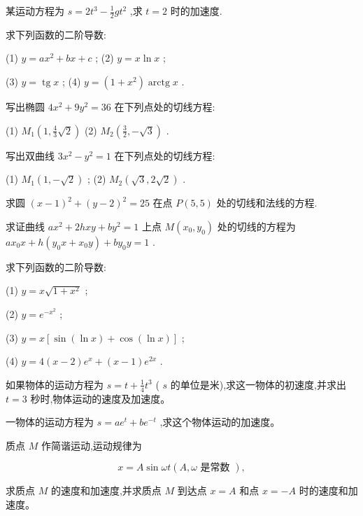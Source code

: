 \documentclass[lang=cn,newtx,10pt,scheme=chinese]{elegantbook}
\begin{document}
\begin{problemset}[练习]

\item 某运动方程为 \(s = 2{t}^{3} - \frac{1}{2}g{t}^{2}\) ,求 \(t = 2\) 时的加速度.

\item 求下列函数的二阶导数:

(1) \(y = a{x}^{2} + {bx} + c\) ; (2) \(y = x\ln x\) ;

(3) \(y = \operatorname{tg}x\) ; (4) \(y = \left( {1 + {x}^{2}}\right) \operatorname{arctg}x\) .

\end{problemset}

\begin{problemset}[习 题 七]

\item 写出椭圆 \(4{x}^{2} + 9{y}^{2} = {36}\) 在下列点处的切线方程:

(1) \({M}_{1}\left( {1,\frac{4}{3}\sqrt{2}}\right)\) (2) \({M}_{2}\left( {\frac{3}{2}, - \sqrt{3}}\right)\) .

\item 写出双曲线 \(3{x}^{2} - {y}^{2} = 1\) 在下列点处的切线方程:

(1) \({M}_{1}\left( {1, - \sqrt{2}}\right)\) ; (2) \({M}_{2}\left( {\sqrt{3},2\sqrt{2}}\right)\) .

\item 求圆 \({\left( x - 1\right) }^{2} + {\left( y - 2\right) }^{2} = {25}\) 在点 \(P\left( {5,5}\right)\) 处的切线和法线的方程.

\item 求证曲线 \(a{x}^{2} + {2hxy} + b{y}^{2} = 1\) 上点 \(M\left( {{x}_{0},{y}_{0}}\right)\) 处的切线的方程为 \(a{x}_{0}x + h\left( {{y}_{0}x + {x}_{0}y}\right) + b{y}_{0}y = 1\) .

\item 求下列函数的二阶导数:

(1) \(y = x\sqrt{1 + {x}^{2}}\) ;

(2) \(y = {e}^{-{x}^{2}}\) ;

(3) \(y = x\left\lbrack {\sin \left( {\ln x}\right) + \cos \left( {\ln x}\right) }\right\rbrack\) ;

(4) \(y = 4\left( {x - 2}\right) {e}^{x} + \left( {x - 1}\right) {e}^{2x}\) .

\item 如果物体的运动方程为 \(s = t + \frac{1}{4}{t}^{3}\) ( \(s\) 的单位是米),求这一物体的初速度,并求出 \(t = 3\) 秒时,物体运动的速度及加速度。

\item 一物体的运动方程为 \(s = a{e}^{t} + b{e}^{-t}\) ,求这个物体运动的加速度。

\item 质点 \(M\) 作简谐运动,运动规律为

\[
x = A\sin {\omega t}\left( {A,\omega \text{ 是常数 }}\right) ,
\]

求质点 \(M\) 的速度和加速度,并求质点 \(M\) 到达点 \(x = A\) 和点 \(x = - A\) 时的速度和加速度。

\end{problemset}
\end{document}

